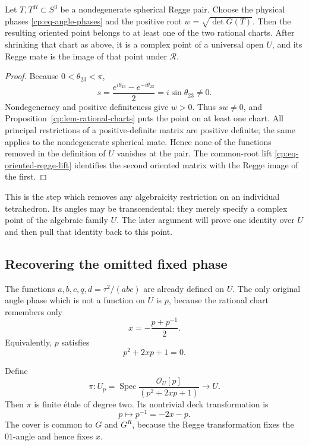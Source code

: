 \begin{proposition}
\label{cp:prop-physical-point-on-chart}
Let \(T,T^R\subset S^3\) be a nondegenerate spherical Regge pair.  Choose
the physical phases \eqref{cp:eq-angle-phases} and the positive root
\(w=\sqrt{\det G(T)}\).  Then the resulting oriented point belongs to at
least one of the two rational charts.  After shrinking that chart as above,
it is a complex point of a universal open \(U\), and its Regge mate is the
image of that point under \(\mathcal R\).
\end{proposition}

\begin{proof}
Because \(0<\theta_{23}<\pi\),
\[
 s=\frac{e^{i\theta_{23}}-e^{-i\theta_{23}}}{2}
   =i\sin\theta_{23}\ne0.
\]
Nondegeneracy and positive definiteness give \(w>0\).  Thus \(sw\ne0\),
and Proposition~\ref{cp:lem-rational-charts} puts the point on
at least one chart.  All principal restrictions of a positive-definite
matrix are positive definite; the same applies to the nondegenerate
spherical mate.  Hence none of the functions removed in the definition of
\(U\) vanishes at the pair.  The common-root lift
\eqref{cp:eq-oriented-regge-lift} identifies the second oriented matrix with
the Regge image of the first.
\end{proof}

This is the step which removes any algebraicity restriction on an individual
tetrahedron.  Its angles may be transcendental: they merely specify a
complex point of the algebraic family \(U\).  The later argument will prove
one identity over \(U\) and then pull that identity back to this point.

\subsection{Recovering the omitted fixed phase}
\label{cp:subsec-fixed-p-cover}

The functions \(a,b,c,q,d=\tau^2/(abc)\) are already defined on \(U\).
The only original angle phase which is not a function on \(U\) is \(p\),
because the rational chart remembers only
\[
 x=-\frac{p+p^{-1}}2.
\]
Equivalently, \(p\) satisfies
\begin{equation}
 p^2+2xp+1=0.
 \label{cp:eq-fixed-p-quadratic}
\end{equation}

\begin{proposition}
\label{cp:prop-fixed-p-cover}
Define
\begin{equation}
 \pi:U_p=
 \operatorname{Spec}
 \frac{\mathcal O_U[p]}{(p^2+2xp+1)}
 \longrightarrow U.
 \label{cp:eq-p-cover}
\end{equation}
Then \(\pi\) is finite \'etale of degree two.  Its nontrivial deck
transformation is
\begin{equation}
 p\longmapsto p^{-1}=-2x-p.
 \label{cp:eq-fixed-p-deck}
\end{equation}
The cover is common to \(G\) and \(G^R\), because the Regge transformation
fixes the \(01\)-angle and hence fixes \(x\).
\end{proposition}

